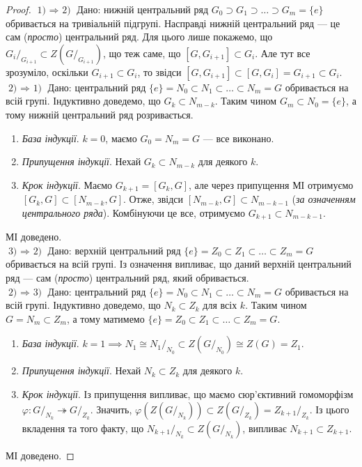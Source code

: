 \documentclass{math_library}
\begin{document}
\begin{proof}
$\boxed{\text{1) $\Rightarrow$ 2)}}$ Дано: нижній центральний ряд $G_0 \supset G_1 \supset \dots \supset G_m = \{e\}$ обривається на тривіальній підгрупі. Насправді нижній центральний ряд --- це сам (\textit{просто}) центральний ряд. Для цього лише покажемо, що ${G_i}/_{G_{i+1}} \subset Z(G/_{G_{i+1}})$, що теж саме, що $[G, G_{i+1}] \subset G_i$. Але тут все зрозуміло, оскільки $G_{i+1} \subset G_i$, то звідси $[G,G_{i+1}] \subset [G,G_{i}] = G_{i+1} \subset G_i$.
\bigskip \\
$\boxed{\text{2) $\Rightarrow$ 1)}}$ Дано: центральний ряд $\{e\} = N_0 \subset N_1 \subset \dots \subset N_m = G$ обривається на всій групі. Індуктивно доведемо, що $G_{k} \subset N_{m-k}$. Таким чином $G_m \subset N_0 = \{e\}$, а тому нижній центральний ряд розривається.
\begin{enumerate}[wide=0pt,label={\Roman*.},nosep]
\item \textit{База індукції}. $k = 0$, маємо $G_0 = N_m = G$ --- все виконано.
\item \textit{Припущення індукції}. Нехай $G_k \subset N_{m-k}$ для деякого $k$.
\item \textit{Крок індукції}. Маємо $G_{k+1} = [G_k,G]$, але через припущення МІ отримуємо $[G_k,G] \subset [N_{m-k}, G]$. Отже, звідси $[N_{m-k}, G] \subset N_{m-k-1}$ (\textit{за означенням центрального ряда}). Комбінуючи це все, отримуємо $G_{k+1} \subset N_{m-k-1}$.
\end{enumerate}
МІ доведено.
\bigskip \\
$\boxed{\text{3) $\Rightarrow$ 2)}}$ Дано: верхній центральний ряд $\{e\} = Z_0 \subset Z_1 \subset \dots \subset Z_m = G$ обривається на всій групі. Із означення випливає, що даний верхній центральний ряд --- сам (\textit{просто}) центральний ряд, який обривається.
\bigskip \\
$\boxed{\text{2) $\Rightarrow$ 3)}}$ Дано: центральний ряд $\{e\} = N_0 \subset N_1 \subset \dots \subset N_m = G$ обривається на всій групі. Індуктивно доведемо, що $N_k \subset Z_k$ для всіх $k$. Таким чином $G = N_m \subset Z_m$, а тому матимемо $\{e\} = Z_0 \subset Z_1 \subset \dots \subset Z_m = G$.
\begin{enumerate}[wide=0pt,label={\Roman*.},nosep]
\item \textit{База індукції}. $k = 1 \implies N_1 \cong {N_1}/_{N_0} \subset Z\left(G/_{N_0}\right) \cong Z(G) = Z_1$.
\item \textit{Припущення індукції}. Нехай $N_k \subset Z_k$ для деякого $k$.
\item \textit{Крок індукції}. Із припущення випливає, що маємо сюр'єктивний гомоморфізм $\varphi \colon G/_{N_k} \twoheadrightarrow G/_{Z_k}$. Значить, $\varphi(Z(G/_{N_k})) \subset Z(G/_{Z_k}) = {Z_{k+1}}/_{Z_k}$. Із цього вкладення та того факту, що ${N_{k+1}}/_{N_k} \subset Z(G/_{N_k})$, випливає $N_{k+1} \subset Z_{k+1}$.
\end{enumerate}
МІ доведено.
\end{proof}
\end{document}
